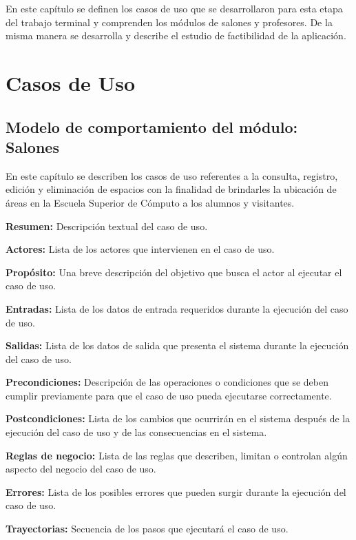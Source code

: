 En este capítulo se definen los casos de uso que se desarrollaron para esta etapa del trabajo terminal y comprenden los módulos de salones y profesores. De la misma manera se desarrolla y describe el estudio de factibilidad de la aplicación.
\newpage
\section{Casos de Uso}
\subsection{Modelo de comportamiento del módulo:  Salones \label{chp:modeloComportamientoSalones}}
En este capítulo se describen los casos de uso referentes a la consulta, registro, edición y eliminación de espacios con la finalidad de brindarles la ubicación de áreas en la Escuela Superior de Cómputo a los alumnos y visitantes. \bigskip

\begin{objetivos}
	\item {\bf Resumen:} Descripción textual del caso de uso.
	\item {\bf Actores:} Lista de los actores que intervienen en el caso de uso.
	\item {\bf Propósito:} Una breve descripción del objetivo que busca el actor al ejecutar el caso de uso.
	\item {\bf Entradas:} Lista de los datos de entrada requeridos durante la ejecución del caso de uso.
	\item {\bf Salidas:} Lista de los datos de salida que presenta el sistema durante la ejecución del caso de uso.
	\item {\bf Precondiciones:} Descripción de las operaciones o condiciones que se deben cumplir previamente para que el caso de uso pueda ejecutarse correctamente.
	\item {\bf Postcondiciones:} Lista de los cambios que ocurrirán en el sistema después de la ejecución del caso de uso y de las consecuencias en el sistema.
	\item {\bf Reglas de negocio:} Lista de las reglas que describen, limitan o controlan algún aspecto del negocio del caso de uso.
	\item {\bf Errores:} Lista de los posibles errores que pueden surgir durante la ejecución del caso de uso.
	\item {\bf Trayectorias:} Secuencia de los pasos que ejecutará el caso de uso.
\end{objetivos}

